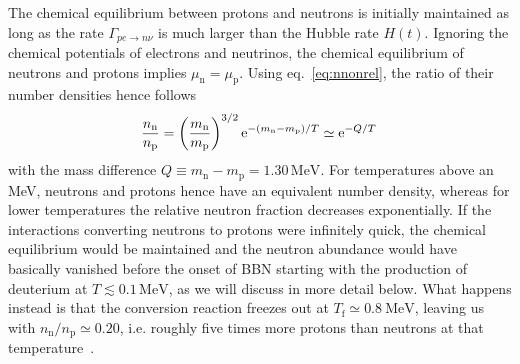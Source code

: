 The chemical equilibrium between protons and neutrons is initially maintained as long as the  rate $\Gamma_{pe\rightarrow n\nu}$ is much larger than the Hubble rate $H(t)$. Ignoring the chemical potentials of electrons and neutrinos, the chemical equilibrium of neutrons and protons implies $\mu_\text{n} = \mu_\text{p}$. Using eq.~\eqref{eq:nnonrel}, the ratio of their number densities hence follows
\begin{align}
	\frac{n_\text{n}}{n_\text{p}} = \left( \frac{m_\text{n}}{m_\text{p}} \right)^{3/2} \mathrm{e}^{-(m_\text{n}-m_\text{p})/T} \simeq \mathrm{e}^{-Q/T} \, \label{eq:ntopratio} 
\end{align}
with the mass difference $Q \equiv m_\text{n} - m_\text{p} = 1.30 \, \text{MeV}$. For temperatures above an MeV, neutrons and protons hence have an equivalent number density, whereas for lower temperatures the relative neutron fraction decreases exponentially. If the interactions converting neutrons to protons were infinitely quick, the chemical equilibrium would be maintained and the neutron abundance would have basically vanished before the onset of \ac{BBN} starting with the production of deuterium at $T \lesssim 0.1 \, \text{MeV}$, as we will discuss in more detail below. What happens instead is that the conversion reaction freezes out at $T_\text{f} \simeq 0.8~\text{MeV}$, leaving us with $n_\text{n} / n_\text{p} \simeq 0.20$, i.e. roughly five times more protons than neutrons at that temperature~\cite{Baumann:2022mni}.

